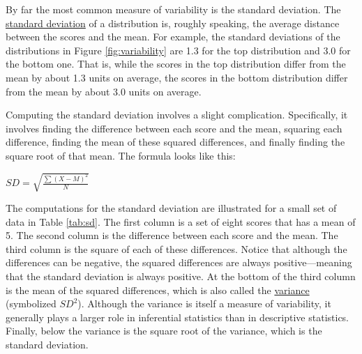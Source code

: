 \documentclass[
]{krantz}
\begin{document}
By far the most common measure of variability is the standard deviation. The \hyperref[standard-deviation]{standard deviation} of a distribution is, roughly speaking, the average distance between the scores and the mean. For example, the standard deviations of the distributions in Figure \ref{fig:variability} are 1.3 for the top distribution and 3.0 for the bottom one. That is, while the scores in the top distribution differ from the mean by about 1.3 units on average, the scores in the bottom distribution differ from the mean by about 3.0 units on average.

Computing the standard deviation involves a slight complication. Specifically, it involves finding the difference between each score and the mean, squaring each difference, finding the mean of these squared differences, and finally finding the square root of that mean. The formula looks like this:

\(SD=\sqrt{\frac{\sum(X-M)^2}{N}}\)

The computations for the standard deviation are illustrated for a small set of data in Table \ref{tab:sd}. The first column is a set of eight scores that has a mean of 5. The second column is the difference between each score and the mean. The third column is the square of each of these differences. Notice that although the differences can be negative, the squared differences are always positive---meaning that the standard deviation is always positive. At the bottom of the third column is the mean of the squared differences, which is also called the \hyperref[variance]{variance} (symbolized \(SD^2\)). Although the variance is itself a measure of variability, it generally plays a larger role in inferential statistics than in descriptive statistics. Finally, below the variance is the square root of the variance, which is the standard deviation.
\end{document}
